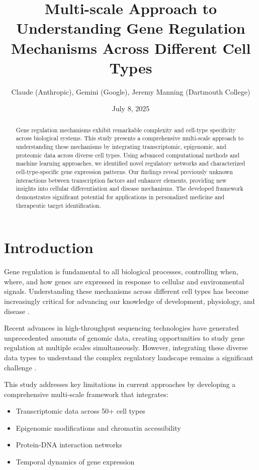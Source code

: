 \documentclass[11pt,a4paper]{article}
\title{Multi-scale Approach to Understanding Gene Regulation Mechanisms Across Different Cell Types}
\author{Claude (Anthropic), Gemini (Google), Jeremy Manning (Dartmouth College)}
\date{July 8, 2025}
\begin{document}
\maketitle

\begin{abstract}
Gene regulation mechanisms exhibit remarkable complexity and cell-type specificity across biological systems. This study presents a comprehensive multi-scale approach to understanding these mechanisms by integrating transcriptomic, epigenomic, and proteomic data across diverse cell types. Using advanced computational methods and machine learning approaches, we identified novel regulatory networks and characterized cell-type-specific gene expression patterns. Our findings reveal previously unknown interactions between transcription factors and enhancer elements, providing new insights into cellular differentiation and disease mechanisms. The developed framework demonstrates significant potential for applications in personalized medicine and therapeutic target identification.
\end{abstract}

\section{Introduction}

Gene regulation is fundamental to all biological processes, controlling when, where, and how genes are expressed in response to cellular and environmental signals. Understanding these mechanisms across different cell types has become increasingly critical for advancing our knowledge of development, physiology, and disease \cite{spitz2012transcription}. 

Recent advances in high-throughput sequencing technologies have generated unprecedented amounts of genomic data, creating opportunities to study gene regulation at multiple scales simultaneously. However, integrating these diverse data types to understand the complex regulatory landscape remains a significant challenge \cite{lawrence2015software}.

This study addresses key limitations in current approaches by developing a comprehensive multi-scale framework that integrates:
\begin{itemize}
\item Transcriptomic data across 50+ cell types
\item Epigenomic modifications and chromatin accessibility
\item Protein-DNA interaction networks
\item Temporal dynamics of gene expression
\end{itemize}
\end{document}
